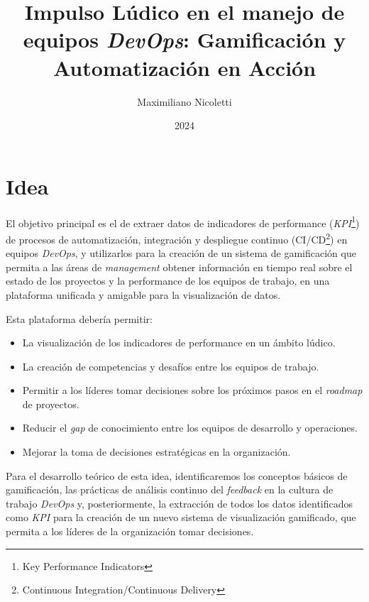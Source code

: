 \documentclass[journal]{IEEEtran}
\begin{document}
\title{Impulso Lúdico en el manejo de equipos \textit{DevOps}: Gamificación y Automatización en Acción}

\author{Maximiliano Nicoletti}

\date{2024}

\maketitle

\section{\textbf{\Large Idea}}

El objetivo principal es el de extraer datos de indicadores de performance (\textit{KPI}\footnote{Key Performance Indicators}) de procesos de automatización, integración y despliegue continuo (CI/CD\footnote{Continuous Integration/Continuous Delivery}) en equipos \textit{DevOps}, y utilizarlos para la creación de un sistema de gamificación que permita a las áreas de \textit{management} obtener información en tiempo real sobre el estado de los proyectos y la performance de los equipos de trabajo, en una plataforma unificada y amigable para la visualización de datos.

Esta plataforma debería permitir:
\begin{itemize}
    \item La visualización de los indicadores de performance en un ámbito lúdico.
    \item La creación de competencias y desafíos entre los equipos de trabajo.
    \item Permitir a los líderes tomar decisiones sobre los próximos pasos en el \textit{roadmap} de proyectos.
    \item Reducir el \textit{gap} de conocimiento entre los equipos de desarrollo y operaciones.
    \item Mejorar la toma de decisiones estratégicas en la organización.
\end{itemize}

Para el desarrollo teórico de esta idea, identificaremos los conceptos básicos de gamificación, las prácticas de análisis continuo del \textit{feedback} en la cultura de trabajo \textit{DevOps} y, posteriormente, la extracción de todos los datos identificados como \textit{KPI} para la creación de un nuevo sistema de visualización gamificado, que permita a los líderes de la organización tomar decisiones.
\end{document}
